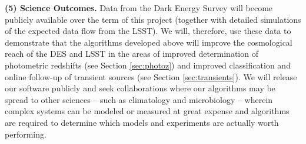\documentclass[prd,nofootbib,floatfix,11pt,tightenlines,nofootinbib]{revtex4}
\begin{document}





{\bf (5) Science Outcomes.}  Data from the Dark Energy Survey will become
publicly available over the term of this project (together with detailed
simulations of the expected data flow from the LSST).  We will, therefore,
use these data to demonstrate that the algorithms developed above will
improve the cosmological reach of the DES and LSST in the areas of improved
determination of photometric redshifts (see Section \ref{sec:photoz}) and
improved classification and online follow-up of transient sources (see Section \ref{sec:transients}).  We will release our software
publicly and seek collaborations where our algorithms may be spread to
other sciences -- such as climatology and microbiology -- wherein complex
systems can be modeled or measured at great expense and algorithms are
required to determine which models and experiments are actually worth
performing.

\end{document}
